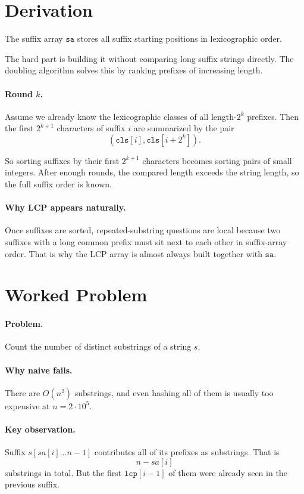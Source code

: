 \section*{Derivation}

The suffix array \(\texttt{sa}\) stores all suffix starting positions in lexicographic order.

The hard part is building it without comparing long suffix strings directly. The doubling algorithm solves this by
ranking prefixes of increasing length.

\paragraph{Round \(k\).}
Assume we already know the lexicographic classes of all length-\(2^k\) prefixes. Then the first \(2^{k+1}\) characters
of suffix \(i\) are summarized by the pair
\[
(\texttt{cls}[i], \texttt{cls}[i + 2^k]).
\]

So sorting suffixes by their first \(2^{k+1}\) characters becomes sorting pairs of small integers. After enough rounds,
the compared length exceeds the string length, so the full suffix order is known.

\paragraph{Why LCP appears naturally.}
Once suffixes are sorted, repeated-substring questions are local because two suffixes with a long common prefix must sit
next to each other in suffix-array order. That is why the LCP array is almost always built together with \(\texttt{sa}\).

\section*{Worked Problem}

\paragraph{Problem.}
Count the number of distinct substrings of a string \(s\).

\paragraph{Why naive fails.}
There are \(O(n^2)\) substrings, and even hashing all of them is usually too expensive at \(n = 2 \cdot 10^5\).

\paragraph{Key observation.}
Suffix \(s[sa[i] \dots n-1]\) contributes all of its prefixes as substrings. That is
\[
n - sa[i]
\]
substrings in total. But the first \(\texttt{lcp}[i-1]\) of them were already seen in the previous suffix.

